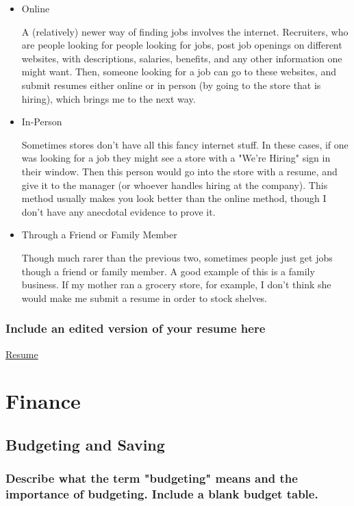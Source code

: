 \documentclass[11pt]{article}
\begin{document}
\begin{itemize}
\item Online
\label{sec:org21bef6a}

A (relatively) newer way of finding jobs involves the internet. Recruiters, who are people looking for people looking for jobs, post job openings on different websites, with descriptions, salaries, benefits, and any other information one might want. Then, someone looking for a job can go to these websites, and submit resumes either online or in person (by going to the store that is hiring), which brings me to the next way.

\item In-Person
\label{sec:org509811c}

Sometimes stores don't have all this fancy internet stuff. In these cases, if one was looking for a job they might see a store with a "We're Hiring" sign in their window. Then this person would go into the store with a resume, and give it to the manager (or whoever handles hiring at the company). This method usually makes you look better than the online method, though I don't have any anecdotal evidence to prove it. 

\item Through a Friend or Family Member
\label{sec:org8eb85a0}

Though much rarer than the previous two, sometimes people just get jobs though a friend or family member. A good example of this is a family business. If my mother ran a grocery store, for example, I don't think she would make me submit a resume in order to stock shelves.
\end{itemize}

\subsubsection*{Include an edited version of your resume here}
\label{sec:org98aa005}

\href{file:///home/kadin/Downloads/Kadin\%20Parker\%20Resume\%20-\%20Any.pdf}{Resume}

\section*{Finance}
\label{sec:org6e9d3a6}
\subsection*{Budgeting and Saving}
\label{sec:org118d6b1}
\subsubsection*{Describe what the term "budgeting" means and the importance of budgeting. Include a blank budget table.}
\label{sec:org41db049}
\end{document}
